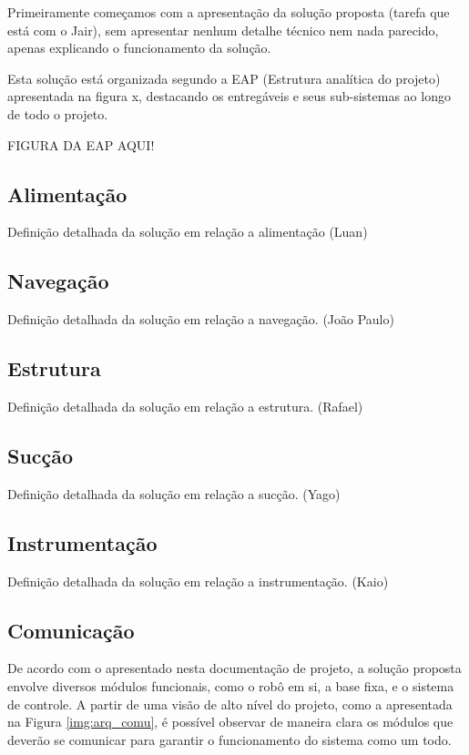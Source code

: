 Primeiramente começamos com a apresentação da solução proposta (tarefa que está com o Jair), sem apresentar nenhum detalhe técnico nem nada parecido, apenas explicando o funcionamento da solução. 

Esta solução está organizada segundo a EAP (Estrutura analítica do projeto) apresentada na figura x, destacando os entregáveis e seus sub-sistemas ao longo de todo o projeto.

FIGURA DA EAP AQUI!

\subsection{Alimentação} %
\label{sub:alimentação}
	Definição detalhada da solução em relação a alimentação (Luan)

\subsection{Navegação} %
\label{sub:automação}
	Definição detalhada da solução em relação a navegação. (João Paulo)

\subsection{Estrutura} %
\label{sub:alimentação}
	Definição detalhada da solução em relação a estrutura. (Rafael)

\subsection{Sucção} %
\label{sub:aspirador}
	Definição detalhada da solução em relação a sucção. (Yago)

\subsection{Instrumentação} %
\label{sub:instrumentação}
	Definição detalhada da solução em relação a instrumentação. (Kaio)

\subsection{Comunicação} %
\label{sub:comunicação}
	De acordo com o apresentado nesta documentação de projeto, a solução proposta envolve diversos módulos funcionais, como o robô em si, a base fixa, e o sistema de controle. A partir de uma visão de alto nível do projeto, como a apresentada na Figura \ref{img:arq_comu}, é possível observar de maneira clara os módulos que deverão se comunicar para garantir o funcionamento do sistema como um todo.

